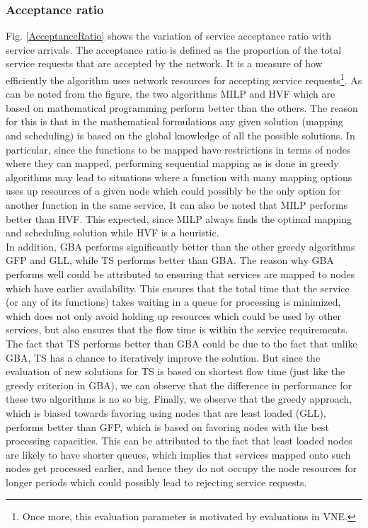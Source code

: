 \documentclass[conference]{IEEEtran}
\begin{document}
\subsubsection{Acceptance ratio} Fig. \ref{AcceptanceRatio} shows the variation of service acceptance ratio with service arrivals. The acceptance ratio is defined as the proportion of the total service requests that are accepted by the network. It is a measure of how efficiently the algorithm uses network resources for accepting service requests\footnote{Once more, this evaluation parameter is motivated by evaluations in VNE.}. As can be noted from the figure, the two algorithms MILP and HVF which are based on mathematical programming perform better than the others. The reason for this is that in the mathematical formulations any given solution (mapping and scheduling) is based on the global knowledge of all the possible solutions. In particular, since the functions to be mapped have restrictions in terms of nodes where they can mapped, performing sequential mapping as is done in greedy algorithms may lead to situations where a function with many mapping options uses up resources of a given node which could possibly be the only option for another function in the same service. It can also be noted that MILP performs better than HVF. This expected, since MILP always finds the optimal mapping and scheduling solution while HVF is a heuristic.\\
\indent In addition, GBA performs significantly better than the other greedy algorithms GFP and GLL, while TS performs better than GBA. The reason why GBA performs well could be attributed to ensuring that services are mapped to nodes which have earlier availability. This ensures that the total time that the service (or any of its functions) takes waiting in a queue for processing is minimized, which does not only avoid holding up resources which could be used by other services, but also ensures that the flow time is within the service requirements. The fact that TS performs better than GBA could be due to the fact that unlike GBA, TS has a chance to iteratively improve the solution. But since the evaluation of new solutions for TS is based on shortest flow time (just like the greedy criterion in GBA), we can observe that the difference in performance for these two algorithms is no so big. Finally, we observe that the greedy approach, which is biased towards favoring using nodes that are least loaded (GLL), performs better than GFP, which is based on favoring nodes with the best processing capacities. This can be attributed to the fact that least loaded nodes are likely to have shorter queues, which implies that services mapped onto such nodes get processed earlier, and hence they do not occupy the node resources for longer periods which could possibly lead to rejecting service requests.
\end{document}
